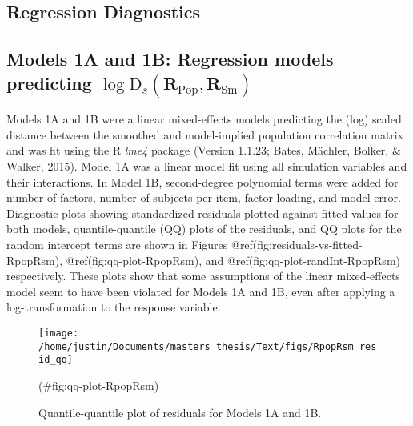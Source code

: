 \clearpage
\makeatletter
\efloat@restorefloats
\makeatother


\begin{appendix}
\hypertarget{regression-diagnostics}{%
\section{Regression Diagnostics}\label{regression-diagnostics}}

\hypertarget{models-1a-and-1b-regression-models-predicting-log-textrmd_smathbfr_textrmpop-mathbfr_textrmsm}{%
\subsection{\texorpdfstring{Models 1A and 1B: Regression models
predicting
\(\log \textrm{D}_s(\mathbf{R}_{\textrm{Pop}}, \mathbf{R}_{\textrm{Sm}})\)}{Models 1A and 1B: Regression models predicting \textbackslash log \textbackslash textrm\{D\}\_s(\textbackslash mathbf\{R\}\_\{\textbackslash textrm\{Pop\}\}, \textbackslash mathbf\{R\}\_\{\textbackslash textrm\{Sm\}\})}}\label{models-1a-and-1b-regression-models-predicting-log-textrmd_smathbfr_textrmpop-mathbfr_textrmsm}}

Models 1A and 1B were a linear mixed-effects models predicting the (log)
scaled distance between the smoothed and model-implied population
correlation matrix and was fit using the R \emph{lme4} package (Version
1.1.23; Bates, Mächler, Bolker, \& Walker, 2015). Model 1A was a linear
model fit using all simulation variables and their interactions. In
Model 1B, second-degree polynomial terms were added for number of
factors, number of subjects per item, factor loading, and model error.
Diagnostic plots showing standardized residuals plotted against fitted
values for both models, quantile-quantile (QQ) plots of the residuals,
and QQ plots for the random intercept terms are shown in Figures
@ref(fig:residuals-vs-fitted-RpopRsm), @ref(fig:qq-plot-RpopRsm), and
@ref(fig:qq-plot-randInt-RpopRsm) respectively. These plots show that
some assumptions of the linear mixed-effects model seem to have been
violated for Models 1A and 1B, even after applying a log-transformation
to the response variable.

\begin{figure}

{\centering \texttt{[image: /home/justin/Documents/masters\_thesis/Text/figs/RpopRsm\_resid\_qq]} 

}

\caption{Quantile-quantile plot of residuals for Models 1A and 1B.}(\#fig:qq-plot-RpopRsm)
\end{figure}


\end{appendix}
